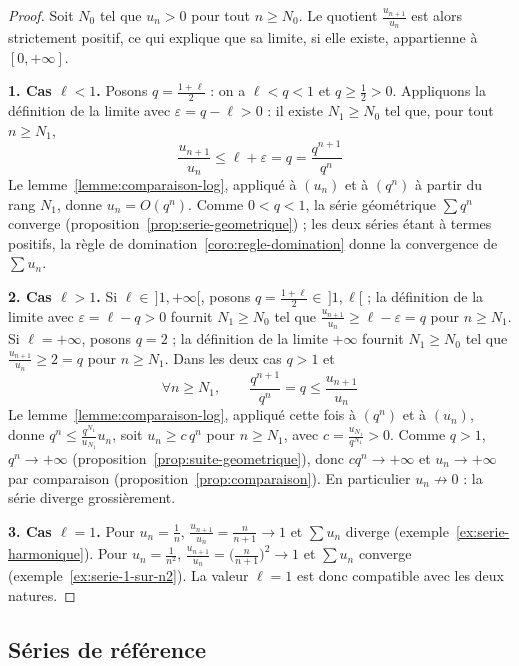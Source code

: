 \begin{proof}
Soit $N_0$ tel que $u_n>0$ pour tout $n\geq N_0$. Le quotient $\frac{u_{n+1}}{u_n}$ est alors strictement positif, ce qui explique que sa limite, si elle existe, appartienne à $[0,+\infty]$.

\textbf{1. Cas $\ell<1$.} Posons $q=\frac{1+\ell}{2}$ : on a $\ell<q<1$ et $q\geq\frac12>0$. Appliquons la définition de la limite avec $\varepsilon=q-\ell>0$ : il existe $N_1\geq N_0$ tel que, pour tout $n\geq N_1$,
\[\frac{u_{n+1}}{u_n}\leq\ell+\varepsilon=q=\frac{q^{n+1}}{q^n}\]
Le lemme~\ref{lemme:comparaison-log}, appliqué à $(u_n)$ et à $(q^n)$ à partir du rang $N_1$, donne $u_n=O(q^n)$. Comme $0<q<1$, la série géométrique $\sum q^n$ converge (proposition~\ref{prop:serie-geometrique}) ; les deux séries étant à termes positifs, la règle de domination~\ref{coro:regle-domination} donne la convergence de $\sum u_n$.

\textbf{2. Cas $\ell>1$.} Si $\ell\in\,]1,+\infty[$, posons $q=\frac{1+\ell}{2}\in\,]1,\ell[$ ; la définition de la limite avec $\varepsilon=\ell-q>0$ fournit $N_1\geq N_0$ tel que $\frac{u_{n+1}}{u_n}\geq\ell-\varepsilon=q$ pour $n\geq N_1$. Si $\ell=+\infty$, posons $q=2$ ; la définition de la limite $+\infty$ fournit $N_1\geq N_0$ tel que $\frac{u_{n+1}}{u_n}\geq 2=q$ pour $n\geq N_1$. Dans les deux cas $q>1$ et
\[\forall n\geq N_1,\qquad\frac{q^{n+1}}{q^n}=q\leq\frac{u_{n+1}}{u_n}\]
Le lemme~\ref{lemme:comparaison-log}, appliqué cette fois à $(q^n)$ et à $(u_n)$, donne $q^n\leq\frac{q^{N_1}}{u_{N_1}}u_n$, soit $u_n\geq c\,q^n$ pour $n\geq N_1$, avec $c=\frac{u_{N_1}}{q^{N_1}}>0$. Comme $q>1$, $q^n\to+\infty$ (proposition~\ref{prop:suite-geometrique}), donc $cq^n\to+\infty$ et $u_n\to+\infty$ par comparaison (proposition~\ref{prop:comparaison}). En particulier $u_n\not\to 0$ : la série diverge grossièrement.

\textbf{3. Cas $\ell=1$.} Pour $u_n=\frac1n$, $\frac{u_{n+1}}{u_n}=\frac{n}{n+1}\to 1$ et $\sum u_n$ diverge (exemple~\ref{ex:serie-harmonique}). Pour $u_n=\frac{1}{n^2}$, $\frac{u_{n+1}}{u_n}=\big(\frac{n}{n+1}\big)^2\to 1$ et $\sum u_n$ converge (exemple~\ref{ex:serie-1-sur-n2}). La valeur $\ell=1$ est donc compatible avec les deux natures.
\end{proof}

\subsection{Séries de référence}
\label{subsec:series-reference}

